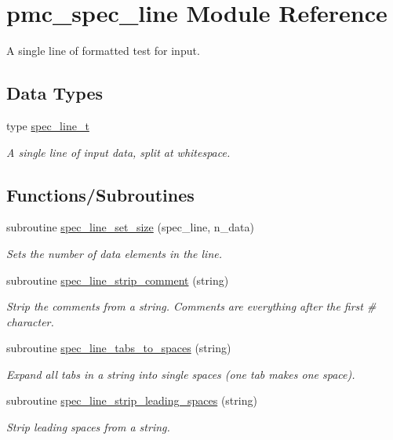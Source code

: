 \hypertarget{namespacepmc__spec__line}{}\section{pmc\+\_\+spec\+\_\+line Module Reference}
\label{namespacepmc__spec__line}


A single line of formatted test for input.  


\subsection*{Data Types}
\begin{DoxyCompactItemize}
\item 
type \mbox{\hyperlink{structpmc__spec__line_1_1spec__line__t}{spec\+\_\+line\+\_\+t}}
\begin{DoxyCompactList}\small\item\em A single line of input data, split at whitespace. \end{DoxyCompactList}\end{DoxyCompactItemize}
\subsection*{Functions/\+Subroutines}
\begin{DoxyCompactItemize}
\item 
subroutine \mbox{\hyperlink{namespacepmc__spec__line_a1db0d0ef2b767a6540419a294120851e}{spec\+\_\+line\+\_\+set\+\_\+size}} (spec\+\_\+line, n\+\_\+data)
\begin{DoxyCompactList}\small\item\em Sets the number of data elements in the line. \end{DoxyCompactList}\item 
subroutine \mbox{\hyperlink{namespacepmc__spec__line_ae8dbd59b9a8d4aa132d5931c8cae419f}{spec\+\_\+line\+\_\+strip\+\_\+comment}} (string)
\begin{DoxyCompactList}\small\item\em Strip the comments from a string. Comments are everything after the first \# character. \end{DoxyCompactList}\item 
subroutine \mbox{\hyperlink{namespacepmc__spec__line_a8bcfccca38c2d4044b3ab638b119f108}{spec\+\_\+line\+\_\+tabs\+\_\+to\+\_\+spaces}} (string)
\begin{DoxyCompactList}\small\item\em Expand all tabs in a string into single spaces (one tab makes one space). \end{DoxyCompactList}\item 
subroutine \mbox{\hyperlink{namespacepmc__spec__line_a70e8cfe2c200d354b7c3ab329854b260}{spec\+\_\+line\+\_\+strip\+\_\+leading\+\_\+spaces}} (string)
\begin{DoxyCompactList}\small\item\em Strip leading spaces from a string. \end{DoxyCompactList}\end{DoxyCompactItemize}
